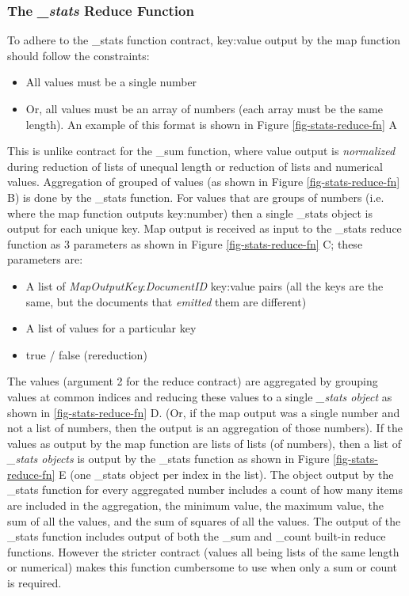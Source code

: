 

\subsubsection{The \textit{\_stats} Reduce Function}
To adhere to the \_stats function contract, key:value output by the map function should follow the constraints:

\begin{itemize}
    \item All values must be a single number
    \item Or, all values must be an array of numbers (each array must be the same length). An example of this format is shown in Figure \ref{fig-stats-reduce-fn} A
\end{itemize}

This is unlike contract for the \_sum function, where value output is \textit{normalized} during reduction of lists of unequal length or reduction of lists and numerical values. Aggregation of grouped of values (as shown in Figure \ref{fig-stats-reduce-fn} B) is done by the \_stats function. For values that are groups of numbers (i.e. where the map function outputs key:number) then a single \_stats object is output for each unique key. Map output is received as input to the \_stats reduce function as 3 parameters as shown in Figure \ref{fig-stats-reduce-fn} C; these parameters are:

\begin{itemize}
    \item A list of \textit{MapOutputKey}:\textit{DocumentID} key:value pairs (all the keys are the same, but the documents that \textit{emitted} them are different)
    \item A list of values for a particular key
    \item true / false (rereduction)
\end{itemize}

The values (argument 2 for the reduce contract) are aggregated by grouping values at common indices and reducing these values to a single \textit{\_stats object} as shown in \ref{fig-stats-reduce-fn} D. (Or, if the map output was a single number and not a list of numbers, then the output is an aggregation of those numbers). If the values as output by the map function are lists of lists (of numbers), then a list of \textit{\_stats objects} is output by the \_stats function as shown in Figure \ref{fig-stats-reduce-fn} E (one \_stats object per index in the list). The object output by the \_stats function for every aggregated number includes a count of how many items are included in the aggregation, the minimum value, the maximum value, the sum of all the values, and the sum of squares of all the values. The output of the \_stats function includes output of both the \_sum and \_count built-in reduce functions. However the stricter contract (values all being lists of the same length or numerical) makes this function cumbersome to use when only a sum or count is required.

